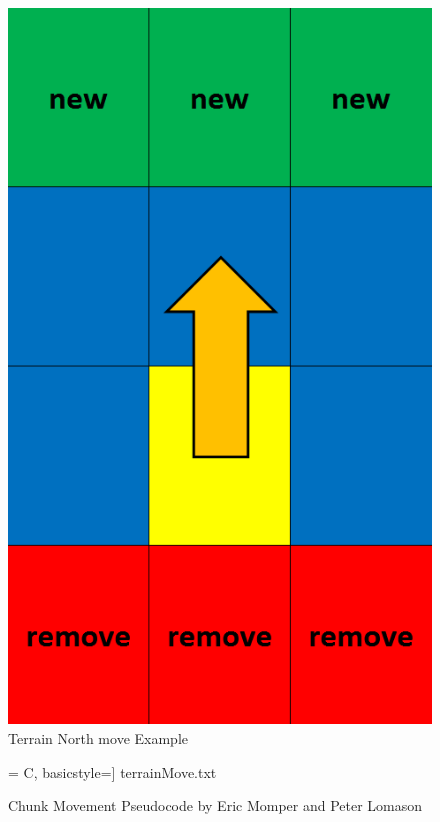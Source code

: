 \documentclass[a4paper,10pt]{article}
\begin{document}
\begin{figure}[H]
	\centerline{\includegraphics[scale=0.2,keepaspectratio]{terrainMove.png}}
	\caption{Terrain North move Example}
	\label{fig:moveTerrain}
	\end{figure}
	
\begin{figure}[H]
	\centerline{ = C, basicstyle=\small] {terrainMove.txt}}
	\caption{Chunk Movement Pseudocode by Eric Momper and Peter Lomason}
	\label{code:terrainMoveCode}
\end{figure}

\pagebreak
\end{document}
